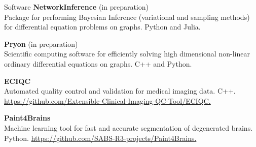 \begin{rSection}{Software}
{\bf NetworkInference} (in preparation) \\
Package for performing Bayesian Inference (variational and sampling methods) for differential equation problems on graphs. Python and Julia. 

{\bf Pryon} (in preparation) \\
Scientific computing software for efficiently solving high dimensional non-linear ordinary differential equations on graphs. C++ and Python.

{\bf ECIQC} \\
Automated quality control and validation for medical imaging data. C++.  \href{https://github.com/Extensible-Clinical-Imaging-QC-Tool/ECIQC}{https://github.com/Extensible-Clinical-Imaging-QC-Tool/ECIQC.}

{\bf Paint4Brains} \\
Machine learning tool for fast and accurate segmentation of degenerated brains. Python. \href{https://github.com/SABS-R3-projects/Paint4Brains}{https://github.com/SABS-R3-projects/Paint4Brains.}
\end{rSection}
